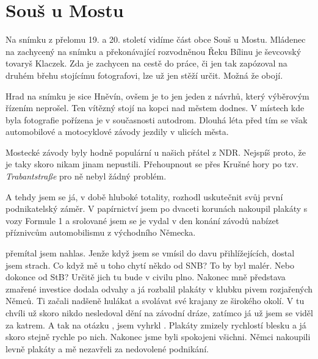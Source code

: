 
\chapter{Souš u Mostu}

Na snímku z přelomu 19. a 20. století vidíme část obce Souš u Mostu. Mládenec
na zachycený na snímku a překonávající rozvodněnou Řeku Bílinu je ševcovský
tovaryš Klaczek. Zda je zachycen na cestě do práce, či jen tak zapózoval na
druhém břehu stojícímu fotografovi, lze už jen stěží určit. Možná že obojí.

Hrad na snímku je sice Hněvín, ovšem je to jen jeden z návrhů, který výběrovým
řízením neprošel. Ten vítězný stojí na kopci nad městem dodnes. V místech kde
byla fotografie pořízena je v současnosti autodrom. Dlouhá léta před tím se
však automobilové a motocyklové závody jezdily v ulicích města.

Mostecké závody byly hodně populární u našich přátel z NDR. Nejspíš proto, že
je taky skoro nikam jinam nepustili. Přehoupnout se přes Krušné hory po tzv.
{\em Trabantstraße} pro ně nebyl žádný problém.

A tehdy jsem se já, v době hluboké totality, rozhodl uskutečnit svůj první
podnikatelský záměr. V papírnictví jsem po dvaceti korunách nakoupil plakáty s
vozy Formule 1 a srolované jsem se je vydal v den konání závodů nabízet
příznivcům automobilismu z východního Německa.

 přemítal
jsem nahlas. Jenže když jsem se vmísil do davu přihlížejících, dostal jsem
strach. Co když mě u toho chytí někdo od SNB? To by byl malér. Nebo dokonce od
StB? Určitě jich tu bude v civilu plno. Nakonec mně představa zmařené investice
dodala odvahy a já rozbalil plakáty v klubku pivem rozjařených Němců. Ti začali
nadšeně hulákat a svolávat své krajany ze širokého okolí. V tu chvíli už skoro
nikdo nesledoval dění na závodní dráze, zatímco já už jsem se viděl za katrem.
A tak na otázku , jsem vyhrkl . Plakáty zmizely
rychlostí blesku a já skoro stejně rychle po nich. Nakonec jsme byli spokojeni
všichni. Němci nakoupili levně plakáty a mě nezavřeli za nedovolené podnikání.

